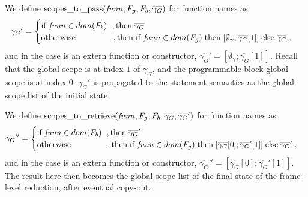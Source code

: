 \documentclass[UTF8]{article}
\begin{document}
We define $\mathrm{scopes\_to\_pass}(\mathit{funn}, F_g , F_b , \overline{\gamma_G})$ for function names as:
 \[  \overline{\gamma_G}' = \begin{cases}
            \mathrm{if} \; \mathit{funn} \in dom(F_b)    \hspace{6pt} ,
            \mathrm{then} \;  \overline{\gamma_G}\\
            \mathrm{otherwise}    \hspace{45pt}     , 
            \mathrm{then} \; \mathrm{if} \; \mathit{funn} \in dom(F_g) \; \mathrm{then} \; [ \emptyset_{\gamma} ; \overline{\gamma_G}[1] ] \; \mathrm{else} \; \overline{\gamma_G}\;,
        \end{cases}\]
and in the case \funn{} is an extern function or constructor, $\overline{\gamma_G}' = [ \emptyset_{\gamma} ; \overline{\gamma_G}[1] ]$.
Recall that the global scope is at index $1$ of $\overline{\gamma_G}$, and the programmable block-global scope is at index $0$. $\overline{\gamma_G}'$ is propagated to the statement semantics as the global scope list of the initial state. 

We define $\mathrm{scopes\_to\_retrieve}(\mathit{funn}, F_g , F_b , \overline{\gamma_G}, \overline{\gamma_G}')$ for function names as:
\[\overline{\gamma_G}'' = \begin{cases}
            \mathrm{if} \; \mathit{funn} \in dom(F_b)    \hspace{6pt} ,
            \mathrm{then} \;   \overline{\gamma_G}'\\
            \mathrm{otherwise}    \hspace{45pt}     , 
            \mathrm{then} \; \mathrm{if} \; \mathit{funn} \in dom(F_g) \; \mathrm{then} \; [\overline{\gamma_G}[0];\overline{\gamma_G}'[1]] \; \mathrm{else} \; \overline{\gamma_G}'\; ,
        \end{cases}
\]
and in the case \funn{} is an extern function or constructor, $\overline{\gamma_G}'' = [\overline{\gamma_G}[0];\overline{\gamma_G}'[1]]$. The result here then becomes the global scope list of the final state of the frame-level reduction, after eventual copy-out.
\end{document}
